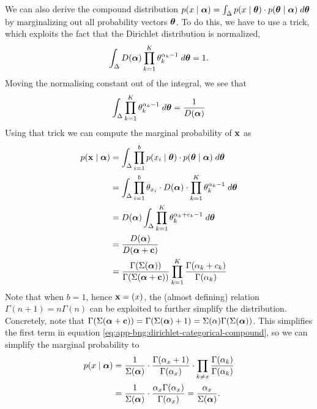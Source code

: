 \documentclass{../src/bcthesispart}
\begin{document}
We can also derive the compound distribution $p(x \mid \boldsymbol{\mathbf{\alpha}}) = \int_{\Delta} p(x \mid \boldsymbol{\mathbf{\theta}})\cdot p(\boldsymbol{\mathbf{\theta}} \mid \boldsymbol{\mathbf{\alpha}}) \; d\boldsymbol{\mathbf{\theta}}$ by marginalizing out all probability vectors $\boldsymbol{\mathbf{\theta}}$.
To do this, we have to use a trick, which exploits the fact that the Dirichlet distribution is normalized,
\begin{equation}
	\int_{\Delta} 
		D(\boldsymbol{\mathbf{\alpha}}) 
		\prod_{k=1}^K \theta_k^{\alpha_k - 1} 
		\; d\boldsymbol{\mathbf{\theta}} 
	= 1.
\end{equation}
Moving the normalising constant out of the integral, we see that
\begin{equation}
	\int_{\Delta} 
		\prod_{k=1}^K \theta_k^{\alpha_k - 1} 
		\; d\boldsymbol{\mathbf{\theta}} 
	= \frac{1}{D(\boldsymbol{\mathbf{\alpha}})}
\end{equation}
Using that trick we can compute the marginal probability of $\boldsymbol{\mathbf{x}}$ as
\begin{align}
	p(\vobs \mid \vect\alpha) 
		&= \int_{\simplex} 
				\prod_{i=1}^b p(\obs_i \mid \vlang) 
				\cdot p(\vlang \mid \vect\alpha) 
				\; d\vlang
			\\
		&= \int_{\simplex} 
				\prod_{i=1}^b \lang_{\obs_i} 
				\cdot D(\vect\alpha) 
				\cdot \prod_{k=1}^K \lang_k^{\alpha_k - 1} 
				\; d\vlang 
			\\
		&= D(\vect\alpha)
			\int_{\simplex} 
				\prod_{k=1}^K \lang_k^{\alpha_k + c_k - 1} 
				\; d\vlang 
			\\
		&= \frac{D(\vect\alpha)}%
			{D(\vect \alpha + \vect c)}
			\label{eq:app-bng:deriv-continue}
			\\
		&= \frac{\Gamma(\vectsum{\vect\alpha})}{\Gamma(\vectsum{\vect\alpha + \vect c})}
			\prod_{k=1}^K \frac{\Gamma(\alpha_k + c_k)}{\Gamma(\alpha_k)}
			\label{eq:app-bng:dirichlet-categorical-compound}
\end{align}
Note that when $b=1$, hence $\boldsymbol{\mathbf{x}} = (x)$, the (almost defining) relation $\Gamma(n+1) = n \Gamma(n)$ can be exploited to further simplify the distribution. 
Concretely, note that $\Gamma(\Sigma(\boldsymbol{\mathbf{\alpha}} + \boldsymbol{\mathbf{c}})) = \Gamma(\Sigma(\boldsymbol{\mathbf{\alpha}}) + 1) = \Sigma(\alpha) \Gamma(\Sigma(\boldsymbol{\mathbf{\alpha}}))$. 
This simplifies the first term in equation \ref{eq:app-bng:dirichlet-categorical-compound}, so we can simplify the marginal probability to
\begin{align}
	p(x \mid \boldsymbol{\mathbf{\alpha}})
		&= \frac{1}{\Sigma(\boldsymbol{\mathbf{\alpha}})}
			\cdot \frac{\Gamma(\alpha_x + 1)}{\Gamma(\alpha_x)}
			\cdot \prod_{k\neq x} \frac{\Gamma(\alpha_k)}{\Gamma(\alpha_k)}
		\\
		&= \frac{1}{\Sigma(\boldsymbol{\mathbf{\alpha}})}
			\cdot \frac{\alpha_x \Gamma(\alpha_x)}{\Gamma(\alpha_x)}
		= \frac{\alpha_x}{\Sigma(\boldsymbol{\mathbf{\alpha}})}.
\end{align}
\end{document}
